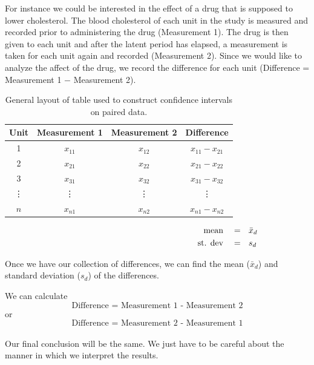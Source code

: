 For instance we could be interested in the effect of a drug that is supposed to lower cholesterol. The blood cholesterol of each unit in the study is measured and recorded prior to administering the drug (Measurement 1). The drug is then given to each unit and after the latent period has elapsed, a measurement is taken for each unit again and recorded (Measurement 2). Since we would like to analyze the affect of the drug, we record the difference for each unit (Difference = Measurement 1 $-$ Measurement 2).

\begin{table}[H]
\begin{center}
\large
\begin{tabular}{c | c | c | c}
Unit	&	Measurement 1	&	Measurement 2		&	Difference			\\
\hline
1		&	$x_{11}$		&	$x_{12}$		&	$x_{11} - x_{21}$	\\
2		&	$x_{21}$		&	$x_{22}$		&	$x_{21} - x_{22}$	\\
3		&	$x_{31}$		&	$x_{32}$		&	$x_{31} - x_{32}$	\\
\vdots	&	\vdots		&	\vdots		&	\vdots			\\
$n$		&	$x_{n1}$		&	$x_{n2}$		&	$x_{n1} - x_{n2}$	\\
\hline
\end{tabular}

\vspace{-0.2500cm}

\begin{align*}
\hspace{6.10cm}
\text{mean}	& ~~~ = ~~ \bar{x}_{d}	\\
\text{st. dev}	& ~~~ = ~~ s_{d}
\end{align*}
\end{center}
\caption{General layout of table used to construct confidence intervals on paired data.}
\end{table}

Once we have our collection of differences, we can find
the mean ($\bar{x}_{d}$) and standard deviation ($s_{d}$) of the differences.

\begin{nt}
We can calculate
	\begin{equation}
	\text{Difference = Measurement~1 - Measurement~2}
	\end{equation}
or
	\begin{equation}
	\text{Difference = Measurement~2 - Measurement~1}
	\end{equation}
\hfill\\
Our final conclusion will be the same. 
We just have to be careful about the manner in which we interpret the results.
\end{nt}



